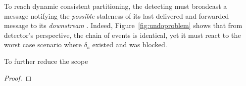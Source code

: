 To reach dynamic consistent partitioning, the detecting \process must
broadcast a message notifying the \emph{possible} staleness of its
last delivered and forwarded message to its \emph{downstream}
\processes. Indeed, Figure~\ref{fig:undoproblem} shows that from
detector's perspective, the chain of events is identical, yet it must
react to the worst case scenario where $\delta_a$ existed and was
blocked.   

\begin{definition}
  To further reduce the scope  
\end{definition}

\begin{theorem}
\end{theorem}

\begin{proof}
\end{proof}



